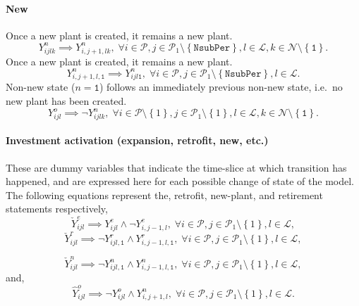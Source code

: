\documentclass{amsart}
\begin{document}
\paragraph{New}
%
Once a new plant is created, it remains a new plant.
%
\begin{equation}
    Y^n_{ijlk} \implies Y^n_{i, j+1, lk}, \; \forall 
    i \in \mathcal{P},
    j \in \mathcal{P}_1 \setminus \left\{\mathtt{NsubPer}\right\},
    l\in \mathcal{L},
    k\in \mathcal{N} \setminus \left\{\mathtt{1}\right\}.
\end{equation}
%
Once a new plant is created, it remains a new plant.
%
\begin{equation}
    Y^n_{i, j+1, l,\mathtt{1}} \implies Y^n_{ijl\mathtt{1}} , \; \forall 
    i \in \mathcal{P},
    j \in \mathcal{P}_1 \setminus \left\{\mathtt{NsubPer}\right\},
    l\in \mathcal{L}.
\end{equation}
%
Non-new state ($n=\mathtt{1}$) follows an immediately previous non-new
state, i.e.\ no new plant has been created.
%
\begin{equation}
    Y^o_{ijl} \implies \neg Y^n_{ijlk}, \;
    \forall i \in \mathcal{P} \setminus \left\{1\right\},
    j \in \mathcal{P}_1 \setminus \left\{1\right\},
    l \in \mathcal{L},
    k \in \mathcal{N} \setminus \left\{\mathtt{1}\right\}.
\end{equation}
%
\paragraph{Investment activation (expansion, retrofit, new, etc.)}
These are dummy variables that indicate the time-slice at which transition has
happened, and are expressed here for each possible change of state of the model.
The following equations represent the, retrofit, new-plant, and retirement
statements respectively,
%
\begin{equation}
    \check{Y}^e_{ijl} \implies Y^e_{ijl} \wedge \neg Y^e_{i,j-1,l}, \;
    \forall i \in \mathcal{P} ,
    j \in \mathcal{P}_1 \setminus \left\{1\right\},
    l \in \mathcal{L},
\end{equation}
%
\begin{equation}
    \check{Y}^r_{ijl} \implies 
    \neg Y^r_{ijl,\mathtt{1}} \wedge 
    Y^r_{i,j-1,l,\mathtt{1}}, \;
    \forall i \in \mathcal{P} ,
    j \in \mathcal{P}_1 \setminus \left\{1\right\},
    l \in \mathcal{L},
\end{equation}

\begin{equation}
    \check{Y}^n_{ijl} \implies 
    \neg Y^n_{ijl,\mathtt{1}} \wedge 
    Y^n_{i,j-1,l,\mathtt{1}}, \;
    \forall i \in \mathcal{P} ,
    j \in \mathcal{P}_1 \setminus \left\{1\right\},
    l \in \mathcal{L},
\end{equation}
%
and,
%
\begin{equation}
    \hat{Y}^o_{ijl} \implies 
    \neg Y^o_{ijl} \wedge 
    Y^n_{i,j+1,l}, \;
    \forall i \in \mathcal{P} ,
    j \in \mathcal{P}_1 \setminus \left\{1\right\},
    l \in \mathcal{L}.
\end{equation}
\end{document}

